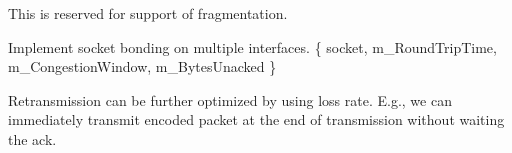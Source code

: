 
\begin{DoxyRefList}
\item[\label{todo__todo000001}%
\hypertarget{todo__todo000001}{}%
Member \hyperlink{struct_network_coding_1_1_header_1_1_data_a21e3e58d1a143834d9c4490613d3c3ff}{Network\+Coding\+:\+:Header\+:\+:Data\+:\+:m\+\_\+\+Last\+Indicator} ]This is reserved for support of fragmentation.  
\item[\label{todo__todo000004}%
\hypertarget{todo__todo000004}{}%
Class \hyperlink{class_network_coding_1_1_transmission_session}{Network\+Coding\+:\+:Transmission\+Session} ]Implement socket bonding on multiple interfaces. \{ socket, m\+\_\+\+Round\+Trip\+Time, m\+\_\+\+Congestion\+Window, m\+\_\+\+Bytes\+Unacked \}  
\item[\label{todo__todo000003}%
\hypertarget{todo__todo000003}{}%
Member \hyperlink{class_network_coding_1_1_transmission_session_a31f038cb688e2e95e40f63821baf34a8}{Network\+Coding\+:\+:Transmission\+Session\+:\+:Process\+Data\+Ack} (const uint8\+\_\+t Rank, const uint8\+\_\+t Max\+Rank, const uint8\+\_\+t Loss, const uint16\+\_\+t Sequence)]Retransmission can be further optimized by using loss rate. E.\+g., we can immediately transmit encoded packet at the end of transmission without waiting the ack. 
\end{DoxyRefList}